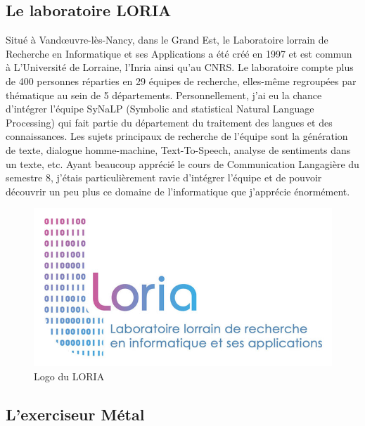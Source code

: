 \documentclass[12pt]{article}
\begin{document}
\subsection{Le laboratoire LORIA}

Situé à Vandœuvre-lès-Nancy, dans le Grand Est, le Laboratoire lorrain de Recherche en Informatique et ses Applications a été créé en 1997 et est commun à L’Université de Lorraine, l’Inria ainsi qu’au CNRS. Le laboratoire compte plus de 400 personnes réparties en 29 équipes de recherche, elles-même regroupées par thématique au sein de 5 départements.
Personnellement, j’ai eu la chance d’intégrer l’équipe SyNaLP (Symbolic and statistical Natural Language Processing) qui fait partie du département du traitement des langues et des connaissances. Les sujets principaux de recherche de l’équipe sont la génération de texte, dialogue homme-machine, Text-To-Speech, analyse de sentiments dans un texte, etc. Ayant beaucoup apprécié le cours de Communication Langagière du semestre 8, j’étais particulièrement ravie d’intégrer l’équipe et de pouvoir découvrir un peu plus ce domaine de l’informatique que j’apprécie énormément. 



\begin{figure}[h]
    \centering
    \includegraphics[scale = 0.3]{logo_loria_complet.jpg}
    \caption{Logo du LORIA}
    \label{fig:my_label}
\end{figure}


\subsection{L'exerciseur Métal}
\end{document}
